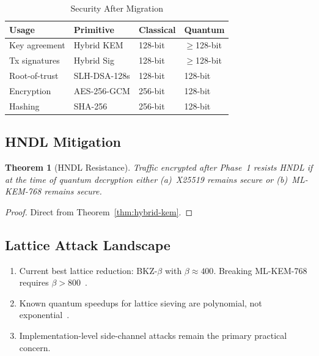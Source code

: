 \documentclass[11pt,a4paper]{article}
\newtheorem{theorem}{Theorem}[section]
\begin{document}
\begin{table}[h]
\centering
\caption{Security After Migration}
\label{tab:security-post}
\begin{tabular}{@{}llll@{}}
\toprule
\textbf{Usage} & \textbf{Primitive} & \textbf{Classical} & \textbf{Quantum} \\
\midrule
Key agreement & Hybrid KEM   & 128-bit & $\geq$128-bit \\
Tx signatures & Hybrid Sig   & 128-bit & $\geq$128-bit \\
Root-of-trust & SLH-DSA-128s & 128-bit & 128-bit \\
Encryption    & AES-256-GCM  & 256-bit & 128-bit \\
Hashing       & SHA-256      & 256-bit & 128-bit \\
\bottomrule
\end{tabular}
\end{table}

\subsection{HNDL Mitigation}

\begin{theorem}[HNDL Resistance]
    Traffic encrypted after Phase~1 resists HNDL if at the time of
    quantum decryption either (a)~X25519 remains secure or (b)~ML-KEM-768
    remains secure.
\end{theorem}

\begin{proof}
    Direct from Theorem~\ref{thm:hybrid-kem}.
\end{proof}

\subsection{Lattice Attack Landscape}

\begin{enumerate}
    \item Current best lattice reduction: BKZ-$\beta$ with $\beta \approx
    400$.  Breaking ML-KEM-768 requires $\beta >
    800$~\cite{albrecht2019estimate}.
    \item Known quantum speedups for lattice sieving are polynomial, not
    exponential~\cite{laarhoven2015quantum}.
    \item Implementation-level side-channel attacks remain the primary
    practical concern.
\end{enumerate}
\end{document}
